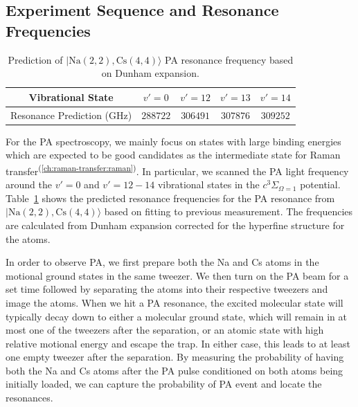 \subsection{Experiment Sequence and Resonance Frequencies}
\label{ch:pa:sequence-res}

\begin{table}
  \centering
  \begin{tabular}{|c|c|c|c|c|}
    \hline
    Vibrational State&$v'=0$&$v'=12$&$v'=13$&$v'=14$\\\hline
    Resonance Prediction (GHz)&$288722$&$306491$&$307876$&$309252$\\\hline
  \end{tabular}
  \caption[PA resonance prediction]{
    Prediction of $|\mathrm{Na(2, 2),Cs(4, 4)}\rangle$ PA resonance frequency
    based on Dunham expansion\cite{grochola_spin-forbidden_2011,dunham_energy_1932}.
    \label{table:pa:theory-prediction}}
\end{table}

For the PA spectroscopy, we mainly focus on states with large binding energies
which are expected to be good candidates as the intermediate state
for Raman transfer\textsuperscript{(\ref{ch:raman-transfer:raman})}.
In particular, we scanned the PA light frequency around the $v'=0$ and $v'=12-14$
vibrational states in the $c^3\Sigma_{\Omega=1}$ potential.
Table~\ref{table:pa:theory-prediction} shows the predicted resonance frequencies
for the PA resonance from $|\mathrm{Na(2, 2),Cs(4, 4)}\rangle$
based on fitting to previous measurement\cite{grochola_spin-forbidden_2011}.
The frequencies are calculated from Dunham expansion\cite{dunham_energy_1932}
corrected for the hyperfine structure for the atoms.

In order to observe PA, we first prepare both the Na and Cs atoms in the motional ground states
in the same tweezer\cite{liu_building_2018}.
We then turn on the PA beam for a set time
followed by separating the atoms into their respective tweezers and image the atoms.
When we hit a PA resonance, the excited molecular state will typically decay down
to either a molecular ground state,
which will remain in at most one of the tweezers after the separation,
or an atomic state with high relative motional energy and escape the trap.
In either case, this leads to at least one empty tweezer after the separation.
By measuring the probability of having both the Na and Cs atoms after the PA pulse
conditioned on both atoms being initially loaded,
we can capture the probability of PA event and locate the resonances.

